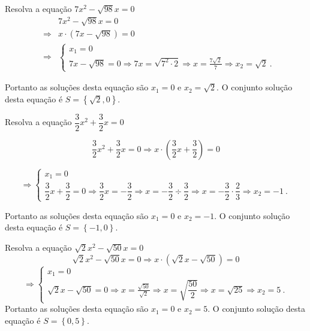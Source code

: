  \begin{exem}
  Resolva a equação $7x^2 - \sqrt{98}x=0$
\begin{eqnarray}
  & & 7x^2 - \sqrt{98}x=0\\
  & \Rightarrow & x \cdot (7x - \sqrt{98})= 0\\
  & \Rightarrow &
    \begin{cases}
    x_1=0 \\
    7x - \sqrt{98}=0
      \Rightarrow 7x = \sqrt{7^2 \cdot 2}
      \Rightarrow x= \frac{7\sqrt{2}}{7}
      \Rightarrow x_2= \sqrt{2} \ .
    \end{cases}
\end{eqnarray}

 Portanto as soluções desta equação são $x_1= 0$ e $x_2= \sqrt{2}$. O conjunto solução desta equação é $S= \left\{ \sqrt{2}, 0 \right\}$.
 \end{exem}

 \begin{exem}
  Resolva a equação $\dfrac{3}{2}x^2 + \dfrac{3}{2}x=0$

\begin{equation}
\dfrac{3}{2}x^2 + \dfrac{3}{2}x=0 \Rightarrow x \cdot (\dfrac{3}{2}x+ \dfrac{3}{2})= 0 
\end{equation}

 \[\Rightarrow
 \begin{cases}
 x_1=0 \\
 \dfrac{3}{2}x + \dfrac{3}{2}=0 \Rightarrow \dfrac{3}{2}x= -\dfrac{3}{2} \Rightarrow x= -\dfrac{3}{2} \div \dfrac{3}{2} \Rightarrow x= -\dfrac{3}{2} \cdot \dfrac{2}{3} \Rightarrow x_2= -1 \ .
 \end{cases} \]

 Portanto as soluções desta equação são $x_1= 0$ e $x_2= -1$. O conjunto solução desta equação é $S= \left\{ -1, 0 \right\}$.
\end{exem}

 \begin{exem}
  Resolva a equação $\sqrt{2}x^2 - \sqrt{50}x=0$
\begin{equation}
\sqrt{2}x^2 - \sqrt{50}x=0 \Rightarrow x \cdot (\sqrt{2}x - \sqrt{50})= 0 
\end{equation}
 \[\Rightarrow
 \begin{cases}
 x_1=0 \\
 \sqrt{2}x - \sqrt{50}=0 \Rightarrow x= \frac{\sqrt{50}}{\sqrt{2}} \Rightarrow x= \sqrt{\dfrac{50}{2}} \Rightarrow x= \sqrt{25} \Rightarrow x_2= 5 \ .
 \end{cases}
 \]
 Portanto as soluções desta equação são $x_1= 0$ e $x_2= 5$. O conjunto solução desta equação é $S= \left\{ 0, 5 \right\}$.
 \end{exem}

